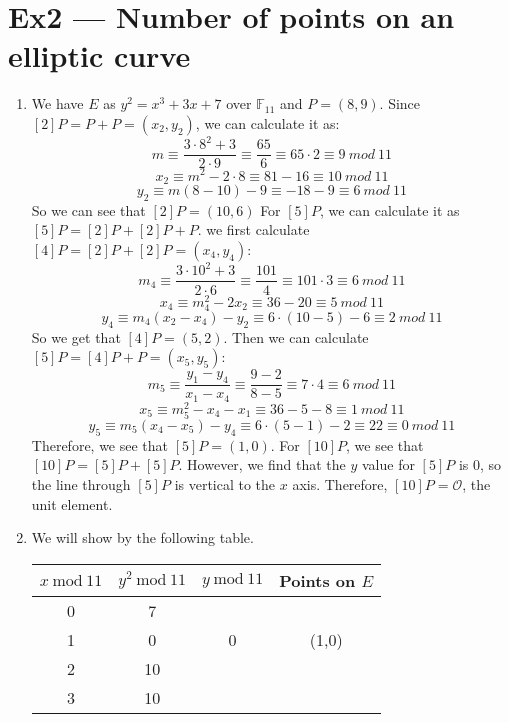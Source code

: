\documentclass[12pt, a4paper]{article}
\begin{document}
\section*{Ex2 --- Number of points on an elliptic curve}
\begin{enumerate}
    \item We have $E$ as $y^2 = x^3 + 3x + 7$ over $\mathbb{F}_{11}$ and $P = (8, 9)$. 
          Since $[2]P = P + P = (x_2, y_2)$, we can calculate it as:
          $$m \equiv \frac{3\cdot 8^2 + 3}{2\cdot 9} \equiv \frac{65}{6} \equiv 65\cdot 2\equiv 9\ mod\ 11$$
          $$x_2 \equiv m^2 - 2\cdot 8 \equiv 81 - 16 \equiv 10\ mod\ 11$$
          $$y_2 \equiv m(8 - 10) - 9 \equiv -18 - 9 \equiv 6\ mod\ 11$$
          So we can see that $[2]P = (10, 6)$\newline
          For $[5]P$, we can calculate it as $[5]P = [2]P + [2]P + P$. we first calculate $[4]P = [2]P + [2]P = (x_4, y_4)$:
          $$m_4 \equiv \frac{3\cdot 10^2 + 3}{2\cdot 6} \equiv \frac{101}{4} \equiv 101\cdot 3 \equiv 6\ mod\ 11$$
          $$x_4 \equiv m_4^2 - 2x_2 \equiv 36 - 20 \equiv 5\ mod\ 11$$
          $$y_4 \equiv m_4(x_2 - x_4) - y_2 \equiv 6\cdot (10 - 5) - 6 \equiv 2\ mod\ 11$$
          So we get that $[4]P = (5, 2)$. Then we can calculate $[5]P = [4]P + P = (x_5, y_5)$:
          $$m_5 \equiv \frac{y_1 - y_4}{x_1 - x_4} \equiv \frac{9-2}{8-5} \equiv 7\cdot 4 \equiv 6\ mod\ 11$$
          $$x_5 \equiv m_5^2 - x_4 - x_1 \equiv 36 - 5 - 8 \equiv 1\ mod\ 11$$
          $$y_5 \equiv m_5(x_4 - x_5) - y_4 \equiv 6\cdot (5-1) - 2 \equiv 22 \equiv 0\ mod\ 11$$
          Therefore, we see that $[5]P = (1, 0)$.\newline
          For $[10]P$, we see that $[10]P = [5]P + [5]P$. However, we find that the $y$ value for $[5]P$ is 0, 
          so the line through $[5]P$ is vertical to the $x$ axis. Therefore, $[10]P = \mathcal{O}$, the unit element.
    \item We will show by the following table. 
          \begin{center}
              \begin{tabular}{c|c|c|c}
                  \hline
                  $x\ \text{mod}\ 11$ & $y^2\ \text{mod}\ 11$ & $y\ \text{mod}\ 11$ & Points on $E$\\
                  \hline
                  0 & 7 & & \\
                  1 & 0 & 0 & (1,0)\\
                  2 & 10 & & \\
                  3 & 10 & & \\

\end{tabular}
\end{center}
\end{enumerate}
\end{document}
